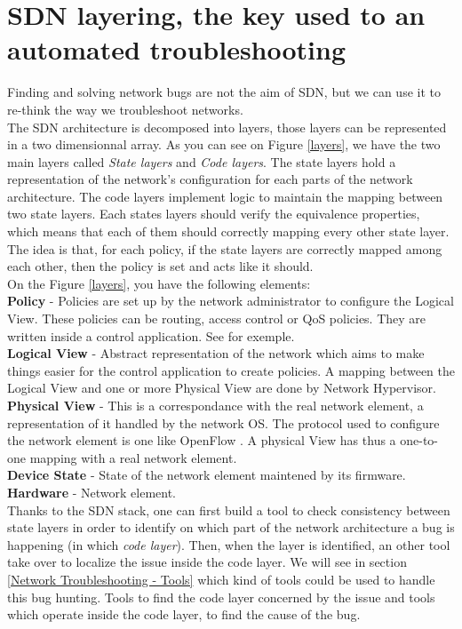 \documentclass[10pt,article]{IEEEtran}
\begin{document}
\section{SDN layering, the key used to an automated troubleshooting}\label{layering}
Finding and solving network bugs are not the aim of SDN, but we can use it to re-think the way we troubleshoot networks.\\ The SDN architecture is decomposed into  layers, those layers can be represented in a two dimensionnal array. As you can see on Figure \ref{layers}, we have the two main layers called \textit{State layers} and \textit{Code layers}. The state layers hold a representation of the network's configuration for each parts of the network architecture. The code layers implement logic to maintain the mapping between two state layers. Each states layers should verify the equivalence properties, which means that each of them should correctly mapping every other state layer. The idea is that, for each policy, if the state layers are correctly mapped among each other, then the policy is  set and acts like it should.\\
On the Figure \ref{layers}, you have the following elements:\\
\textbf{Policy} - Policies are set up by the network administrator to configure the Logical View. These policies can be routing, access control or QoS policies. They are written inside a control application. See \cite{...} for exemple.
\\
\textbf{Logical View} - Abstract representation of the network which aims to make things easier for the control application to create policies. A mapping between the Logical View and one or more Physical View are done by Network Hypervisor.\\
\textbf{Physical View} - This is a correspondance with the real network element, a representation of it handled by the network OS. The protocol used to configure the network element is one like OpenFlow \cite{OpenFlow}. A physical View has thus a one-to-one mapping with a real network element.
\\
\textbf{Device State} - State of the network element maintened by its firmware.
\\
\textbf{Hardware} - Network element. \\

Thanks to the SDN stack, one can first build a tool to check consistency between state layers in order to identify on which part of the network architecture a bug is happening (in which \textit{code layer}). Then, when the layer is identified, an other tool take over to localize the issue inside the code layer. We will see in section \ref{Network Troubleshooting - Tools} which kind of tools could be used to handle this bug hunting. Tools to find the code layer concerned by the issue and tools which operate inside the code layer, to find the cause of the bug.
\end{document}

